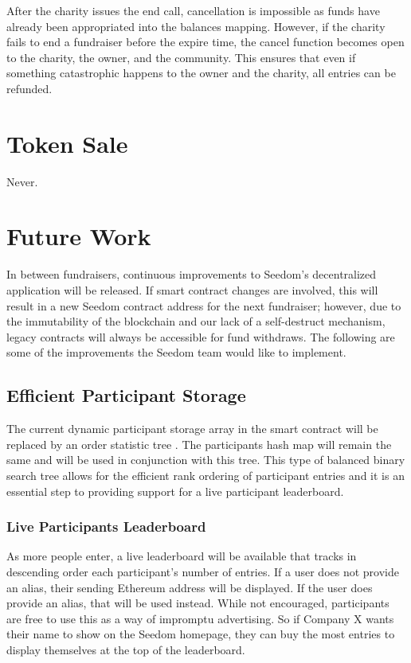 \documentclass[11pt]{article}
\begin{document}
After the charity issues the end call, cancellation is impossible as funds have already been appropriated into the balances mapping. However, if the charity fails to end a fundraiser before the expire time, the cancel function becomes open to the charity, the owner, and the community. This ensures that even if something catastrophic happens to the owner and the charity, all entries can be refunded.

\section{Token Sale}
Never.

\section{Future Work}

In between fundraisers, continuous improvements to Seedom's decentralized application will be released. If smart contract changes are involved, this will result in a new Seedom contract address for the next fundraiser; however, due to the immutability of the blockchain and our lack of a self-destruct mechanism, legacy contracts will always be accessible for fund withdraws. The following are some of the improvements the Seedom team would like to implement.

\subsection{Efficient Participant Storage}

The current dynamic participant storage array in the smart contract will be replaced by an order statistic tree \cite{5}. The participants hash map will remain the same and will be used in conjunction with this tree. This type of balanced binary search tree allows for the efficient rank ordering of participant entries and it is an essential step to providing support for a live participant leaderboard.

\subsubsection{Live Participants Leaderboard}

As more people enter, a live leaderboard will be available that tracks in descending order each participant's number of entries. If a user does not provide an alias, their sending Ethereum address will be displayed. If the user does provide an alias, that will be used instead. While not encouraged, participants are free to use this as a way of impromptu advertising. So if Company X wants their name to show on the Seedom homepage, they can buy the most entries to display themselves at the top of the leaderboard.
\end{document}
